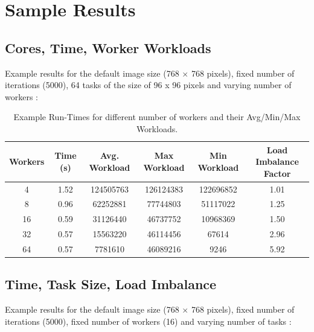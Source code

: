 \documentclass{article}
\begin{document}
\section{Sample Results}


\subsection{Cores, Time, Worker Workloads}
Example results for the default image size (768 $\times$ 768 pixels), fixed number of iterations (5000), 64 tasks of the size of 96 x 96 pixels and varying number of workers :

\begin{table}[h]
\begin{center}
\begin{tabular}{ | c | c | c | c | c | c | }
\hline
	Workers & Time (s) & Avg. Workload & Max Workload & Min Workload & Load Imbalance Factor \\ \hline
	4 & 1.52 &124505763 & 126124383 & 122696852 & 1.01 \\ \hline
	8 & 0.96 &  62252881 & 77744803 & 51117022  & 1.25 \\ \hline
	16 & 0.59 & 31126440 & 46737752 & 10968369  & 1.50 \\ \hline
	32 & 0.57 & 15563220  &  46114456  & 67614 & 2.96 \\ \hline
	64 & 0.57 & 7781610  & 46089216&  9246 &5.92 \\ \hline	\end{tabular}
	 \caption{Example Run-Times for different number of workers and their Avg/Min/Max Workloads.}
	 \end{center}
	 \end{table}


\subsection{Time, Task Size, Load Imbalance  }
Example results for the default image size (768 $\times$ 768 pixels), fixed number of iterations (5000), fixed number of workers (16) and varying number of tasks :
\end{document}
